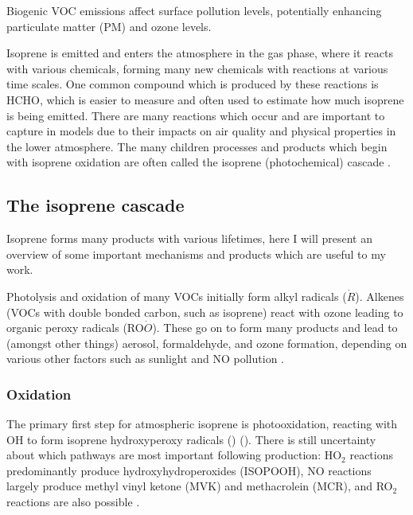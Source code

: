     Biogenic VOC emissions affect surface pollution levels, potentially enhancing particulate matter (PM) and ozone levels.
    
    
    Isoprene is emitted and enters the atmosphere in the gas phase, where it reacts with various chemicals, forming many new chemicals with reactions at various time scales.
    One common compound which is produced by these reactions is HCHO, which is easier to measure and often used to estimate how much isoprene is being emitted.
    There are many reactions which occur and are important to capture in models due to their impacts on air quality and physical properties in the lower atmosphere.
    The many children processes and products which begin with isoprene oxidation are often called the isoprene (photochemical) cascade \cite{Crounse2012,Paulot2012,Wolfe2016}.
    
  \subsection{The isoprene cascade}
    \label{LR:VOCs:IsopCascade}
    
    Isoprene forms many products with various lifetimes, here I will present an overview of some important mechanisms and products which are useful to my work.
    
    Photolysis and oxidation of many VOCs initially form alkyl radicals ($\dot{R}$).
    Alkenes (VOCs with double bonded carbon, such as isoprene) react with ozone leading to organic peroxy radicals (RO$\dot{O}$). 
    These go on to form many products and lead to (amongst other things) aerosol, formaldehyde, and ozone formation, depending on various other factors such as sunlight and NO pollution \citep{Atkinson2000}.
    
    \subsubsection{Oxidation}
    The primary first step for atmospheric isoprene is photooxidation, reacting with OH to form isoprene hydroxyperoxy radicals (\roo) (\cite{Wolfe2016,Marvin2017,Patchen2017}).
    There is still uncertainty about which pathways are most important following \roo production: HO$_2$ reactions predominantly produce hydroxyhydroperoxides (ISOPOOH), NO reactions largely produce methyl vinyl ketone (MVK) and methacrolein (MCR), and RO$_2$ reactions are also possible \cite{Liu2016a}.
    
